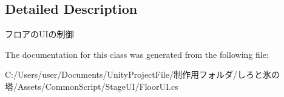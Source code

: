 \subsection{Detailed Description}
フロアの\+U\+Iの制御 



The documentation for this class was generated from the following file\+:\begin{DoxyCompactItemize}
\item 
C\+:/\+Users/user/\+Documents/\+Unity\+Project\+File/制作用フォルダ/しろと氷の塔/\+Assets/\+Common\+Script/\+Stage\+U\+I/Floor\+U\+I.\+cs\end{DoxyCompactItemize}
